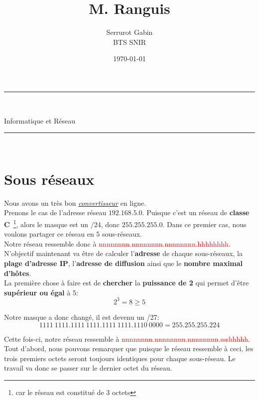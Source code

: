 \documentclass[11pt,a4paper,openany]{book}
\title{M. Ranguis}
\author{Serrurot Gabin\\
BTS SNIR}
\date{\today}
\begin{document}
\sloppy

\begin{minipage}{0.9\linewidth}
\rule{\linewidth}{0.5mm}\\[0.2cm]
\huge\bfseries
\begin{center}
Informatique et Réseau
\end{center}
\rule{\linewidth}{0.5mm}\\[0.2cm]
\maketitle
\end{minipage}

\newpage

\tableofcontents

\newpage

\chapter{Sous réseaux}

Nous avons un très bon \href{https://www.sebastienadam.be/ipcalculator/}{\textit{convertisseur}} en ligne.\\

Prenons le cas de l'adresse réseau $ 192.168.5.0 $. Puisque c'est un réseau de \textbf{classe C}~\footnote{car le réseau est constitué de 3 octets}, alors le masque est un $ /24 $, donc $ 255.255.255.0 $. Dans ce premier cas, nous voulons partager ce réseau en 5 sous-réseaux.\\
Notre réseau ressemble donc à \textcolor{red}{nnnnnnnn.nnnnnnnn.nnnnnnnn.hhhhhhhh}. N'objectif maintenant va être de calculer l'\textbf{adresse} de chaque sous-réseaux, la \textbf{plage d'adresse IP}, l'\textbf{adresse de diffusion} ainsi que le \textbf{nombre maximal d'hôtes}.\\
La première chose à faire est de \textbf{chercher} la \textbf{puissance de 2} qui permet d'être \textbf{supérieur ou égal} à 5:
\begin{equation*}
2^{3} = 8 \geq 5
\end{equation*}

Notre masque a donc changé, il est devenu un /27:
\begin{equation*}
1111~1111.1111~1111.1111~1111.1110~0000 = 255.255.255.224
\end{equation*}

Cette fois-ci, notre réseau ressemble à \textcolor{red}{nnnnnnnn.nnnnnnnn.nnnnnnnn.ssshhhhh}. Tout d'abord, nous pouvons remarquer que puisque le réseau ressemble à ceci, les trois premiers octets seront toujours identiques pour chaque sous-réseau. Le travail va donc se passer sur le dernier octet du réseau.\\
\end{document}
